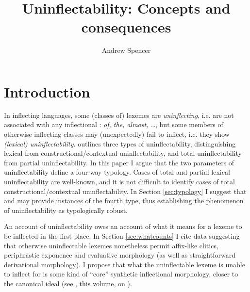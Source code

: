 \documentclass[output=paper,colorlinks,citecolor=brown]{langscibook}
\author{Andrew Spencer\orcid{}\affiliation{University of Essex}}
\title{Uninflectability: Concepts and consequences}
\begin{document}
\maketitle

\section{Introduction}

In inflecting languages, some (classes of) lexemes are \textit{uninflecting}, i.e. are not associated with any inflectional : \textit{of, the, almost, \ldots}, but some members of otherwise inflecting  classes may (unexpectedly) fail to inflect, i.e. they show \textit{(lexical) uninflectability}. \citet{spencer2020} outlines three types of uninflectability, distinguishing lexical from constructional/contextual uninflectability, and total uninflectability from partial uninflectability. In this paper I argue that the two parameters of uninflectability define a four-way typology. Cases of total and partial lexical uninflectability are well-known, and it is not difficult to identify cases of total constructional/contextual uninflectability. In Section \ref{sec:typology} I suggest that  and  may provide instances of the fourth type, thus establishing the phenomenon of uninflectability as typologically robust.  

An account of uninflectability owes an account of what it means for a lexeme to be inflected in the first place. In Section \ref{sec:whatcounts} I cite data suggesting that otherwise  uninflectable lexemes nonetheless permit affix-like clitics, periphrastic exponence and evaluative morphology (as well as straightforward derivational morphology). I propose that what the uninflectable lexeme is unable to inflect for is some kind of ``core'' synthetic inflectional morphology, closer to the canonical ideal (see \citeauthor{corbett2025}, this volume, on ).
\end{document}
